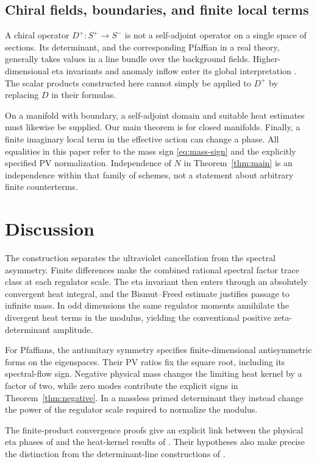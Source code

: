 \documentclass[11pt,a4paper]{article}
\theoremstyle{remark}
\numberwithin{equation}{section}
\begin{document}
\subsection{Chiral fields, boundaries, and finite local terms}

A chiral operator $D^+:S^+\to S^-$ is not a self-adjoint operator
on a single space of sections. Its determinant, and the corresponding
Pfaffian in a real theory, generally takes values in a line bundle
over the background fields. Higher-dimensional eta invariants and
anomaly inflow enter its global interpretation
\cite{DF,FM,WY}. The scalar products constructed here cannot simply
be applied to $D^+$ by replacing $D$ in their formulas.

On a manifold with boundary, a self-adjoint domain and suitable heat
estimates must likewise be supplied. Our main theorem is for closed
manifolds. Finally, a finite imaginary local term in the effective
action can change a phase. All equalities in this paper refer to
the mass sign \eqref{eq:mass-sign} and the explicitly specified PV
normalization. Independence of $N$ in Theorem~\ref{thm:main} is an
independence within that family of schemes, not a statement about
arbitrary finite counterterms.

\section{Discussion}

The construction separates the ultraviolet cancellation from the
spectral asymmetry. Finite differences make the combined rational
spectral factor trace class at each regulator scale. The eta
invariant then enters through an absolutely convergent heat integral,
and the Bismut--Freed estimate justifies passage to infinite mass.
In odd dimensions the same regulator moments annihilate the
divergent heat terms in the modulus, yielding the conventional
positive zeta-determinant amplitude.

For Pfaffians, the antiunitary symmetry specifies finite-dimensional
antisymmetric forms on the eigenspaces. Their PV ratios fix the
square root, including its spectral-flow sign. Negative physical
mass changes the limiting heat kernel by a factor of two, while
zero modes contribute the explicit signs in
Theorem~\ref{thm:negative}. In a massless primed determinant they
instead change the power of the regulator scale required to
normalize the modulus.

The finite-product convergence proofs give an explicit link between
the physical eta phases of \cite{Witten,WY} and the heat-kernel
results of \cite{BF,Ponge}. Their hypotheses also make precise the
distinction from the determinant-line constructions of \cite{DF,FM}.
\end{document}
